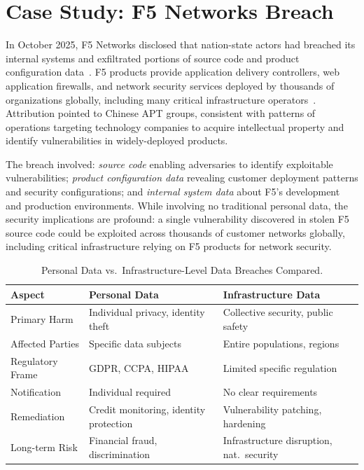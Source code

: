 \documentclass[sigconf,nonacm]{acmart}
\begin{document}
\section{Case Study: F5 Networks Breach}

In October 2025, F5 Networks disclosed that nation-state actors had breached its internal
systems and exfiltrated portions of source code and product configuration
data~\cite{vincen2025f5}. F5 products provide application delivery controllers, web
application firewalls, and network security services deployed by thousands of
organizations globally, including many critical infrastructure
operators~\cite{soper2025f5}. Attribution pointed to Chinese APT groups, consistent with
patterns of operations targeting technology companies to acquire intellectual property
and identify vulnerabilities in widely-deployed products.

The breach involved: \emph{source code} enabling adversaries to identify exploitable
vulnerabilities; \emph{product configuration data} revealing customer deployment patterns
and security configurations; and \emph{internal system data} about F5's development and
production environments. While involving no traditional personal data, the security
implications are profound: a single vulnerability discovered in stolen F5 source code
could be exploited across thousands of customer networks globally, including critical
infrastructure relying on F5 products for network security.

\begin{table}[h]
\caption{Personal Data vs.\ Infrastructure-Level Data Breaches Compared.}
\label{tab:comparison}
\small
\begin{tabularx}{\columnwidth}{@{}p{1.9cm}XX@{}}
\toprule
\textbf{Aspect} & \textbf{Personal Data} & \textbf{Infrastructure Data} \\
\midrule
Primary Harm     & Individual privacy, identity theft & Collective security, public safety \\
\addlinespace[3pt]
Affected Parties & Specific data subjects             & Entire populations, regions \\
\addlinespace[3pt]
Regulatory Frame & GDPR, CCPA, HIPAA                  & Limited specific regulation \\
\addlinespace[3pt]
Notification     & Individual required                 & No clear requirements \\
\addlinespace[3pt]
Remediation      & Credit monitoring, identity protection & Vulnerability patching, hardening \\
\addlinespace[3pt]
Long-term Risk   & Financial fraud, discrimination    & Infrastructure disruption, nat.\ security \\
\bottomrule
\end{tabularx}
\end{table}
\end{document}
